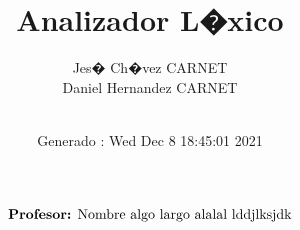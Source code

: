 \documentclass[letterpaper,twoside,12pt]{article}
\title{Analizador L�xico}
\date {Generado : Wed Dec  8 18:45:01 2021
}\author{Jes� Ch�vez CARNET \\  Daniel Hernandez CARNET \\ \\}
\begin{document}
\begin{titlepage}
\maketitle
\sffamily
\begin{align*}
\text{\textbf{Profesor:} Nombre algo largo alalal lddjlksjdk} \\ 
\end{align*}
\end{titlepage}
\end{document}
